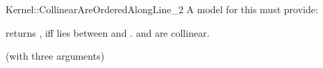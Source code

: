 \begin{ccRefFunctionObjectConcept}{Kernel::CollinearAreOrderedAlongLine_2}
A model for this must provide:


         {returns , iff  lies between  
          and . \ccPrecond {} and  are 
          collinear.}

\ccRefines
{} (with three arguments)

\ccSeeAlso

 \\


\end{ccRefFunctionObjectConcept}
